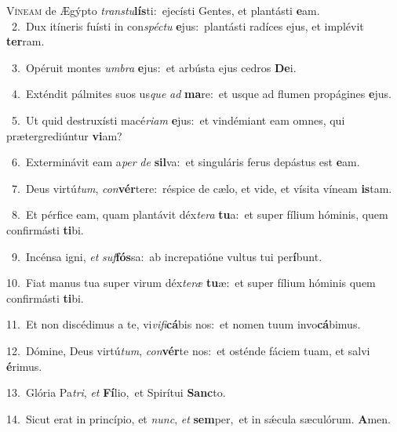 \lettrine{\initial\textcolor{\initialcolor}{V}}{íneam} de Ægýpto \textit{trans}\-\textit{tu}\textbf{lís}ti:~\star ejecísti Gentes, et plantásti \textbf{e}\-am.\\
{\numbfont\textcolor{\numbcolor}{~2.}}~Dux itíneris fuísti in con\-\textit{spéc}\-\textit{tu} \textbf{e}\-jus:~\star plantásti radíces ejus, et implévit \textbf{ter}\-ram.\par
{\numbfont\textcolor{\numbcolor}{~3.}}~Opéruit montes \textit{um}\-\textit{bra} \textbf{e}\-jus:~\star et arbústa ejus cedros \textbf{De}\-i.\par
{\numbfont\textcolor{\numbcolor}{~4.}}~Exténdit pálmites suos us\textit{que} \textit{ad} \textbf{ma}\-re:~\star et usque ad flumen propágines \textbf{e}\-jus.\par
{\numbfont\textcolor{\numbcolor}{~5.}}~Ut quid destruxísti macé\-\textit{ri}\-\textit{am} \textbf{e}\-jus:~\star et vindémiant eam omnes, qui prætergrediúntur \textbf{vi}\-am?\par
{\numbfont\textcolor{\numbcolor}{~6.}}~Exterminávit eam a\textit{per} \textit{de} \textbf{sil}\-va:~\star et singuláris ferus depástus est \textbf{e}\-am.\par
{\numbfont\textcolor{\numbcolor}{~7.}}~Deus virtú\-\textit{tum}\-, \textit{con}\-\textbf{vér}tere:~\star réspice de cælo, et vide, et vísita víneam \textbf{is}\-tam.\par
{\numbfont\textcolor{\numbcolor}{~8.}}~Et pérfice eam, quam plantávit déx\-\textit{te}\-\textit{ra} \textbf{tu}\-a:~\star et super fílium hóminis, quem confirmásti \textbf{ti}\-bi.\par
{\numbfont\textcolor{\numbcolor}{~9.}}~Incénsa igni, \textit{et} \textit{suf}\-\textbf{fós}sa:~\star ab increpatióne vultus tui per\-\textbf{í}\-bunt.\par
{\numbfont\textcolor{\numbcolor}{10.}}~Fiat manus tua super virum déx\-\textit{te}\-\textit{ræ} \textbf{tu}\-æ:~\star et super fílium hóminis quem confirmásti \textbf{ti}\-bi.\par
{\numbfont\textcolor{\numbcolor}{11.}}~Et non discédimus a te, vi\-\textit{vi}\-\textit{fi}\textbf{cá}bis nos:~\star et nomen tuum invo\-\textbf{cá}\-bimus.\par
{\numbfont\textcolor{\numbcolor}{12.}}~Dómine, Deus virtú\-\textit{tum}\-, \textit{con}\-\textbf{vér}te nos:~\star et osténde fáciem tuam, et salvi \textbf{é}\-rimus.\par
{\numbfont\textcolor{\numbcolor}{13.}}~Glória Pa\-\textit{tri}\-, \textit{et} \textbf{Fí}\-lio,~\star et Spirítui \textbf{Sanc}\-to.\par
{\numbfont\textcolor{\numbcolor}{14.}}~Sicut erat in princípio, et \textit{nunc}\-, \textit{et} \textbf{sem}\-per,~\star et in sǽcula sæculórum. \textbf{A}\-men.\par
